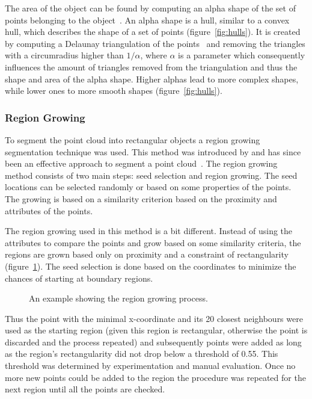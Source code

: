 {The area of the object can be found by computing an alpha shape of the set of points belonging to the object~\citep{edelsbrunner1983shape}. An alpha shape is a hull, similar to a convex hull, which describes the shape of a set of points (figure~\ref{fig:hulls}). It is created by computing a Delaunay triangulation of the points~\citep{delaunay1934sphere} and removing the triangles with a circumradius higher than \(1/\alpha\), where \(\alpha\) is a parameter which consequently influences the amount of triangles removed from the triangulation and thus the shape and area of the alpha shape. Higher alphas lead to more complex shapes, while lower ones to more smooth shapes (figure~\ref{fig:hulls}).

\subsubsection{Region Growing}
To segment the point cloud into rectangular objects a region growing segmentation technique was used. This method was introduced by \citet{besl1988segmentation} and has since been an effective approach to segment a point cloud~\citep{tovari2005segmentation, rabbani2006segmentation, nurunnabi2012robust, vosselman2013point, elberink2014user, vo2015octree}. The region growing method consists of two main steps: seed selection and region growing. The seed locations can be selected randomly or based on some properties of the points. The growing is based on a similarity criterion based on the proximity and attributes of the points.

The region growing used in this method is a bit different. Instead of using the attributes to compare the points and grow based on some similarity criteria, the regions are grown based only on proximity and a constraint of rectangularity (figure~\ref{fig:regiongrowing}). The seed selection is done based on the coordinates to minimize the chances of starting at boundary regions.

\begin{figure}
	\centering
	
	\caption{An example showing the region growing process.}
	\label{fig:regiongrowing}
\end{figure}

Thus the point with the minimal x-coordinate and its 20 closest neighbours were used as the starting region (given this region is rectangular, otherwise the point is discarded and the process repeated) and subsequently points were added as long as the region’s rectangularity did not drop below a threshold of 0.55. This threshold was determined by experimentation and manual evaluation. Once no more new points could be added to the region the procedure was repeated for the next region until all the points are checked.

}
